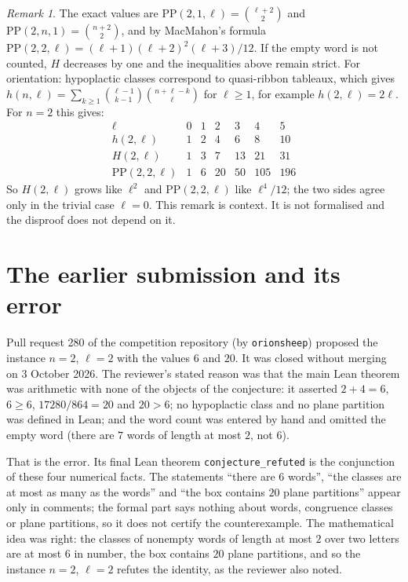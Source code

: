 \documentclass[11pt]{article}
\theoremstyle{remark}
\newtheorem*{remark}{Remark}
\begin{document}
\begin{remark}
The exact values are $\mathrm{PP}(2,1,\ell)=\binom{\ell+2}2$ and
$\mathrm{PP}(2,n,1)=\binom{n+2}2$, and by MacMahon's formula
$\mathrm{PP}(2,2,\ell)=(\ell+1)(\ell+2)^2(\ell+3)/12$. If the empty word
is not counted, $H$ decreases by one and the inequalities above remain
strict. For orientation: hypoplactic classes correspond to quasi-ribbon
tableaux, which gives
$h(n,\ell)=\sum_{k\ge1}\binom{\ell-1}{k-1}\binom{n+\ell-k}{\ell}$ for
$\ell\ge1$, for example $h(2,\ell)=2\ell$. For $n=2$ this gives:
\[
\begin{array}{c|cccccc}
 \ell&0&1&2&3&4&5\\\hline
 h(2,\ell)&1&2&4&6&8&10\\
 H(2,\ell)&1&3&7&13&21&31\\
 \mathrm{PP}(2,2,\ell)&1&6&20&50&105&196
\end{array}
\]
So $H(2,\ell)$ grows like $\ell^2$ and $\mathrm{PP}(2,2,\ell)$ like
$\ell^4/12$; the two sides agree only in the trivial case $\ell=0$. This
remark is context. It is not formalised and the disproof does not depend
on it.
\end{remark}

\section*{The earlier submission and its error}
Pull request 280 of the competition repository (by
\texttt{orionsheep}) proposed the instance $n=2$, $\ell=2$ with the
values $6$ and $20$. It was closed without merging on 3 October 2026.
The reviewer's stated reason was that the main Lean theorem was
arithmetic with none of the objects of the conjecture: it asserted
$2+4=6$, $6\ge6$, $17280/864=20$ and $20>6$; no hypoplactic class and no
plane partition was defined in Lean; and the word count was entered by
hand and omitted the empty word (there are $7$ words of length at most
$2$, not $6$).

That is the error. Its final Lean theorem \texttt{conjecture\_refuted}
is the conjunction of these four numerical facts. The statements
``there are $6$ words'', ``the classes are at most as many as the
words'' and ``the box contains $20$ plane partitions'' appear only in
comments; the formal part says nothing about words, congruence classes
or plane partitions, so it does not certify the counterexample. The
mathematical idea was right: the classes of nonempty words of length at
most $2$ over two letters are at most $6$ in number, the box contains
$20$ plane partitions, and so the instance $n=2$, $\ell=2$ refutes the
identity, as the reviewer also noted.
\end{document}
